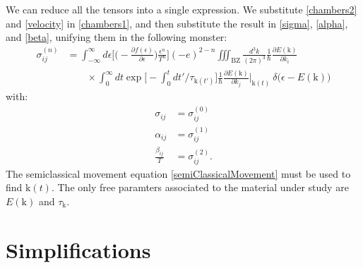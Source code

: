 \documentclass[notitlepage,11pt,nofootinbib]{revtex4-1}
\renewcommand{\vec}[1]{\bm{\mathrm{#1}}}
\begin{document}
\begin{tcolorbox}[colback=black!2!white,colframe=white!10!black,title=All-in-one equation]
We can reduce all the tensors into a single expression. We substitute \eqref{chambers2} and \eqref{velocity} in \eqref{chambers1}, and then substitute the result in \eqref{sigma}, \eqref{alpha}, and \eqref{beta}, unifying them in the following monster:
\begin{align}
\sigma_{ij}^{(n)}
&=
\int_{-\infty}^{\infty}d\epsilon
\bigg[\Big(-\frac{\partial f(\epsilon)}{\partial \epsilon}\Big)\frac{\epsilon^{n}}{T^{n}}\bigg]
(-e)^{2-n}\iiint_{\text{BZ}}\frac{d^3k}{(2\pi)^3}
\frac{1}{\hbar}\frac{\partial E(\vec k)}{\partial k_i} %
\nonumber\\
&\qquad\times
\int_{0}^{\infty}dt
\exp\Big[
-\int_{0}^{t}dt'/\tau_{\vec k(t')}
\Big]
\frac{1}{\hbar}\frac{\partial E(\vec k)}{\partial k_j}\Big|_{\vec k(t)} %
\ \delta\big(\epsilon-E(\vec k)\big)
\label{chambers}
\end{align}
with:
\begin{align}
\sigma_{ij}&=\sigma_{ij}^{(0)}\\
\alpha_{ij}&=\sigma_{ij}^{(1)}\\
\frac{\beta_{ij}}{T}&=\sigma_{ij}^{(2)}.
\end{align}
The semiclassical movement equation \eqref{semiClassicalMovement} must be used to find $\vec k(t)$. The only free paramters associated to the material under study are $E(\vec k)$ and $\tau_{\vec k}$. 
\end{tcolorbox}






\section{Simplifications}
\end{document}
